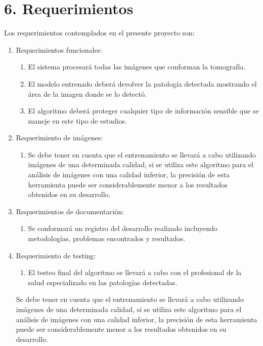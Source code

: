 \documentclass[
11pt, %
]{charter}
\begin{document}
\section{6. Requerimientos}
\label{sec:requerimientos}

Los requerimientos contemplados en el presente proyecto son:

\begin{enumerate}
	\item Requerimientos funcionales:
		\begin{enumerate}
			\item El sistema procesará todas las imágenes que conforman la tomografía.
			\item El modelo entrenado deberá devolver la patología detectada mostrando el área de la imagen 
			donde se lo detectó.
			\item El algoritmo deberá proteger cualquier tipo de información sensible que se maneje en este tipo de estudios.
		\end{enumerate}
	\item Requerimiento de imágenes:
		\begin{enumerate}
			\item 	Se debe tener en cuenta que el entrenamiento se llevará a cabo utilizando imágenes de una determinada calidad, 
					si se utiliza este algoritmo para el análisis de imágenes con una calidad inferior, la precisión de esta 
					herramienta puede ser considerablemente menor a los resultados obtenidos en su desarrollo.
		\end{enumerate}
	\item Requerimientos de documentación:
		\begin{enumerate}
			\item Se conformará un registro del desarrollo realizado incluyendo metodologías, problemas encontrados y resultados.
		\end{enumerate}
	\item Requerimiento de testing:
		\begin{enumerate}
			\item El testeo final del algoritmo se llevará a cabo con el profesional de la salud especializado en las patologías detectadas.
		\end{enumerate}
	


		Se debe tener en cuenta que el entrenamiento se llevará a cabo utilizando imágenes de una determinada calidad, 
		si se utiliza este algoritmo para el análisis de imágenes con una calidad inferior, la precisión de esta 
		herramienta puede ser considerablemente menor a los resultados obtenidos en su desarrollo.


\end{enumerate}
\end{document}
